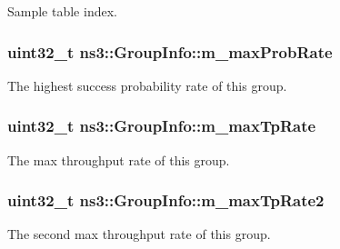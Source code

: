 Sample table index. 

\subsubsection[{\texorpdfstring{m\+\_\+max\+Prob\+Rate}{m_maxProbRate}}]{\setlength{\rightskip}{0pt plus 5cm}uint32\+\_\+t ns3\+::\+Group\+Info\+::m\+\_\+max\+Prob\+Rate}\hypertarget{structns3_1_1GroupInfo_a2c8beb4988dd5bd00f75983abd5df018}{}\label{structns3_1_1GroupInfo_a2c8beb4988dd5bd00f75983abd5df018}


The highest success probability rate of this group. 

\subsubsection[{\texorpdfstring{m\+\_\+max\+Tp\+Rate}{m_maxTpRate}}]{\setlength{\rightskip}{0pt plus 5cm}uint32\+\_\+t ns3\+::\+Group\+Info\+::m\+\_\+max\+Tp\+Rate}\hypertarget{structns3_1_1GroupInfo_a072b4d31fd42e1608f13ba940bab4dbe}{}\label{structns3_1_1GroupInfo_a072b4d31fd42e1608f13ba940bab4dbe}


The max throughput rate of this group. 

\subsubsection[{\texorpdfstring{m\+\_\+max\+Tp\+Rate2}{m_maxTpRate2}}]{\setlength{\rightskip}{0pt plus 5cm}uint32\+\_\+t ns3\+::\+Group\+Info\+::m\+\_\+max\+Tp\+Rate2}\hypertarget{structns3_1_1GroupInfo_ae2bbabe645229fa186236594d54a5c09}{}\label{structns3_1_1GroupInfo_ae2bbabe645229fa186236594d54a5c09}


The second max throughput rate of this group. 

